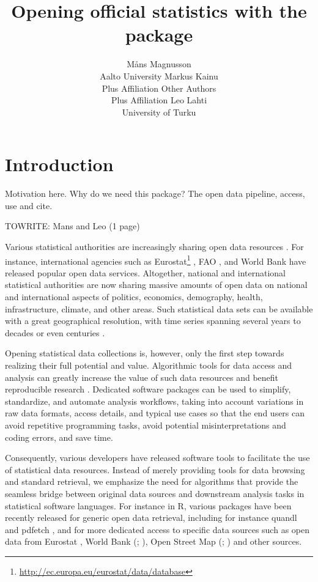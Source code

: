 \documentclass[article]{jss}
\author{M\r{a}ns Magnusson\\Aalto University \And 
        Markus Kainu\\Plus Affiliation  \And 
        Other Authors\\Plus Affiliation  \And
        Leo Lahti\\University of Turku}
\title{Opening  official statistics with the \pkg{pxweb} package}
\begin{document}


\section[Introduction]{Introduction}

Motivation here. Why do we need this package? The open data pipeline, access, use and cite.

TOWRITE: Mans and Leo (1 page)

Various statistical authorities are increasingly sharing open data resources \cite{xxx}. For instance, international agencies such as Eurostat\footnote{\url{http://ec.europa.eu/eurostat/data/database}} \cite{xxx}, FAO \cite{xxx}, and World Bank \cite{xxx} have released popular open data services. Altogether, national and international statistical authorities are now sharing massive amounts of open data on national and international aspects of politics, economics, demography, health, infrastructure, climate, and other areas. Such statistical data sets can be available with a great geographical resolution, with time series spanning several years to decades or even centuries \cite{xxx}.

Opening statistical data collections is, however, only the first step towards realizing their full potential and value. Algorithmic tools for data access and analysis can greatly increase the value of such data resources and benefit reproducible research \citep{Gandrud13, Boettiger2015}. Dedicated software packages can be used to simplify, standardize, and automate analysis workflows, taking into account variations in raw data formats, access details, and typical use cases so that the end users can avoid  repetitive programming tasks, avoid potential misinterpretations and coding errors, and save time. 

Consequently, various developers have released software tools to facilitate the use of statistical data resources. Instead of merely providing tools for data browsing and standard retrieval, we emphasize the need for algorithms that provide the seamless bridge between original data sources and downstream analysis tasks in statistical software languages. For instance in R, various packages have been recently released for generic open data retrieval, including for instance quandl \cite{quandl} and pdfetch \cite{pdfetch}, and for more dedicated access to specific data sources such as open data from Eurostat \cite{Lahti17eurostat}, World Bank (; \citealt{WDI}), Open Street Map (; \citealt{osmar}) and other sources.
\end{document}
